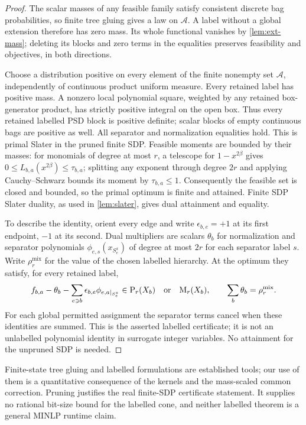 \begin{proof}
The scalar masses of any feasible family satisfy consistent discrete bag
probabilities, so finite tree gluing gives a law on $\mathcal A$. A label
without a global extension therefore has zero mass. Its whole functional
vanishes by \cref{lem:ext-mass}; deleting its blocks and zero terms in the
equalities preserves feasibility and objectives, in both directions.

Choose a distribution positive on every element of the finite nonempty
set $\mathcal A$, independently of continuous product uniform measure.
Every retained label has positive mass. A nonzero local polynomial square,
weighted by any retained box-generator product, has strictly positive
integral on the open box. Thus every retained labelled PSD block is
positive definite; scalar blocks of empty continuous bags are positive
as well. All separator and normalization equalities hold. This is primal
Slater in the pruned finite SDP. Feasible moments are bounded by their
masses: for monomials of degree at most $r$, a telescope for
$1-x^{2\beta}$ gives $0\le L_{b,a}(x^{2\beta})\le\tau_{b,a}$; splitting
any exponent through degree $2r$ and applying Cauchy--Schwarz bounds its
moment by $\tau_{b,a}\le1$. Consequently the feasible set is closed and
bounded, so the primal optimum is finite and attained. Finite SDP Slater
duality, as used in \cref{lem:slater}, gives dual attainment and equality.

To describe the identity, orient every edge and write
$\epsilon_{b,e}=+1$ at its first endpoint, $-1$ at its second. Dual
multipliers are scalars $\theta_b$ for normalization and separator
polynomials $\phi_{e,s}(x_{S_e^x})$ of degree at most $2r$ for each
separator label $s$. Write $\rho_r^{\mathrm{mix}}$ for the value of the
chosen labelled hierarchy. At the optimum they satisfy, for every retained label,
\[
 f_{b,a}-\theta_b-
 \sum_{e\ni b}\epsilon_{b,e}\phi_{e,a|_{S_e^z}}
 \in\mathrm{P}_r(X_b)\quad\text{or}\quad\mathrm{M}_r(X_b),
 \qquad \sum_b\theta_b=\rho_r^{\mathrm{mix}}.
\]
For each global permitted assignment the separator terms cancel when
these identities are summed. This is the asserted labelled certificate;
it is not an unlabelled polynomial identity in surrogate integer
variables. No attainment for the unpruned SDP is needed.
\end{proof}

Finite-state tree gluing and labelled formulations are established tools;
our use of them is a quantitative consequence of the kernels and the
mass-scaled common correction. Pruning justifies the real finite-SDP
certificate statement. It supplies no rational bit-size bound for the
labelled cone, and neither labelled theorem is a general MINLP runtime
claim.
